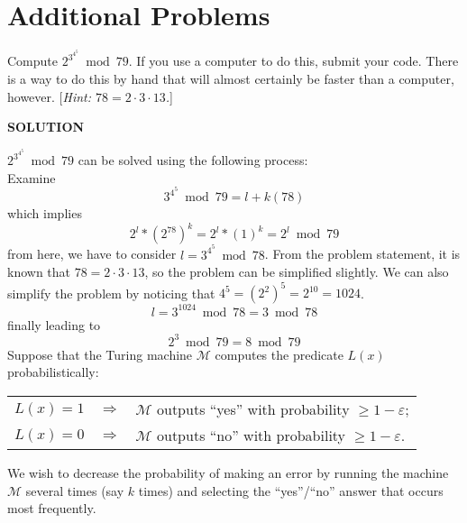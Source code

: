 \documentclass{exam} %
\newcommand{\cl}[1]{\mathcal{#1}}  %
\theoremstyle{plain}
\theoremstyle{definition}
\theoremstyle{remark}
\newcommand{\ds}[1]{ \displaystyle{#1} }
\numberwithin{equation}{section}  %
\renewcommand{\epsilon}{\varepsilon}
\newcommand{\sol}{\begin{center}\textbf{SOLUTION}\end{center}}
\begin{document}
\section{Additional Problems}
\begin{questions}
\question Compute $\ds{ 2^{3^{4^5}} \bmod 79}$. If you use a computer to do
this, submit your code. There is a way to do this by hand that will almost
certainly be faster than a computer, however. [\emph{Hint: $78 = 2\cdot
3\cdot 13$.}] 
  \sol
  $\ds{ 2^{3^{4^5}} \bmod 79}$ can be solved using the following process:\\
  Examine \[\ds{3^{4^5}} \bmod 79 = l + k(78)\] which implies 
  \[ 2^l*(2^{78})^k = 2^l*(1)^k = 2^l \bmod 79 \]
  from here, we have to consider $ l = \ds{3^{4^5}}\bmod 78 $. From the problem 
  statement, it is known that $78 = 2\cdot 3 \cdot 13$, so the problem can be
  simplified slightly. We can also simplify the problem by noticing that $4^5 =
  (2^2)^5 = 2^10 = 1024$.
  \[
    l = \ds{3^{1024}}\bmod 78 = 3 \bmod 78 
  \]
  finally leading to 
  \[
    2^3 \bmod 79 = 8 \bmod 79
  \]
\question Suppose that the Turing machine $\cl{M}$ computes the predicate
$L(x)$ probabilistically:
\begin{center} \renewcommand{\arraystretch}{1.5}
  \begin{tabular}{rcl}
  $L(x) = 1$ & $\Rightarrow$ & $\cl{M}$ outputs ``yes'' with probability 
    $\geq 1 - \epsilon$; \\
  $L(x) = 0$ & $\Rightarrow$ & $\cl{M}$ outputs ``no'' with probability 
    $\geq 1 - \epsilon$.
\end{tabular} \end{center}
We wish to decrease the probability of making an error by running the
machine $\cl{M}$ several times (say $k$ times) and selecting the
``yes''/``no'' answer that occurs most frequently.

\begin{parts}

\end{parts}
\end{questions}
\end{document}
